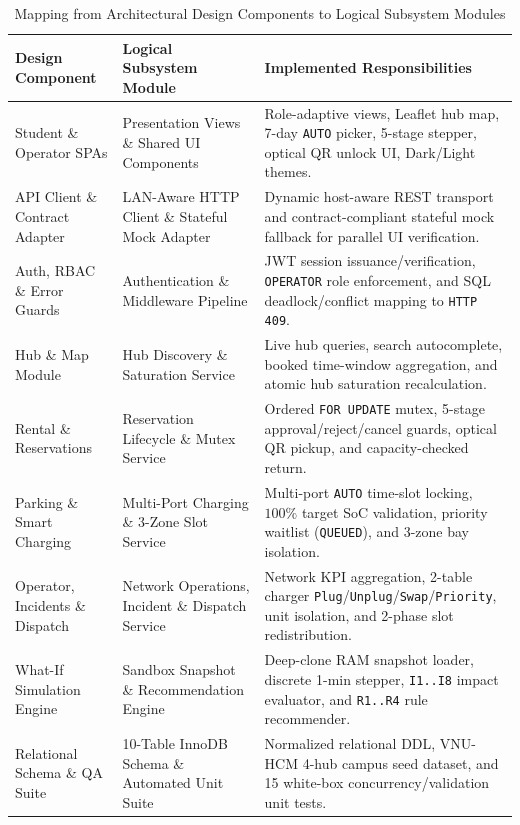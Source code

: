 \begin{table}[H]
  \centering
  \singlespacing\footnotesize
  \caption{Mapping from Architectural Design Components to Logical Subsystem Modules}
  \label{tab:code-mapping}
  \renewcommand{\arraystretch}{1.22}
  \begin{tabularx}{\textwidth}{|L{3.5cm}|L{4.5cm}|Y|}
    \hline
    \textbf{Design Component} & \textbf{Logical Subsystem Module} & \textbf{Implemented Responsibilities} \\
    \hline
    Student \& Operator SPAs & Presentation Views \& Shared UI Components & Role-adaptive views, Leaflet hub map, 7-day \texttt{AUTO} picker, 5-stage stepper, optical QR unlock UI, Dark/Light themes. \\
    \hline
    API Client \& Contract Adapter & LAN-Aware HTTP Client \& Stateful Mock Adapter & Dynamic host-aware REST transport and contract-compliant stateful mock fallback for parallel UI verification. \\
    \hline
    Auth, RBAC \& Error Guards & Authentication \& Middleware Pipeline & JWT session issuance/verification, \texttt{OPERATOR} role enforcement, and SQL deadlock/conflict mapping to \texttt{HTTP 409}. \\
    \hline
    Hub \& Map Module & Hub Discovery \& Saturation Service & Live hub queries, search autocomplete, booked time-window aggregation, and atomic hub saturation recalculation. \\
    \hline
    Rental \& Reservations & Reservation Lifecycle \& Mutex Service & Ordered \texttt{FOR UPDATE} mutex, 5-stage approval/reject/cancel guards, optical QR pickup, and capacity-checked return. \\
    \hline
    Parking \& Smart Charging & Multi-Port Charging \& 3-Zone Slot Service & Multi-port \texttt{AUTO} time-slot locking, $100\%$ target SoC validation, priority waitlist (\texttt{QUEUED}), and 3-zone bay isolation. \\
    \hline
    Operator, Incidents \& Dispatch & Network Operations, Incident \& Dispatch Service & Network KPI aggregation, 2-table charger \texttt{Plug}/\allowbreak\texttt{Unplug}/\allowbreak\texttt{Swap}/\allowbreak\texttt{Priority}, unit isolation, and 2-phase slot redistribution. \\
    \hline
    What-If Simulation Engine & Sandbox Snapshot \& Recommendation Engine & Deep-clone RAM snapshot loader, discrete 1-min stepper, \texttt{I1..I8} impact evaluator, and \texttt{R1..R4} rule recommender. \\
    \hline
    Relational Schema \& QA Suite & 10-Table InnoDB Schema \& Automated Unit Suite & Normalized relational DDL, VNU-HCM 4-hub campus seed dataset, and 15 white-box concurrency/validation unit tests. \\
    \hline
  \end{tabularx}
\end{table}

